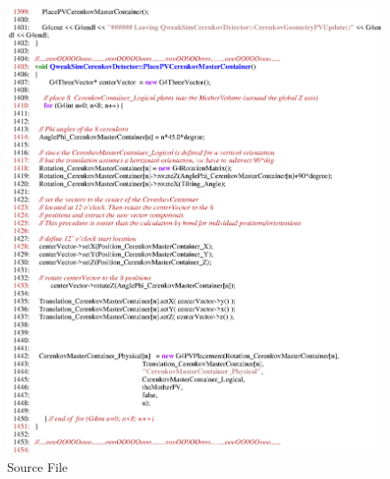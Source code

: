 \begin{figure}[ht]
  \hspace{0cm}
  \includegraphics[scale=0.8]{./figures5/QweakSimCerenkovDetector.cc-p23.eps}
  \caption{\label{SourceV23} Source File}
           \label{fig:V-SC-27}
\end{figure}

\clearpage

